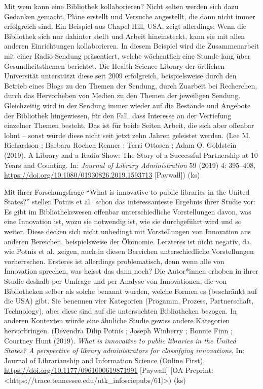 \documentclass[a4paper,
fontsize=11pt,
oneside,
numbers=noperiodatend,
parskip=half-,
bibliography=totoc,
final
]{scrartcl}
\begin{document}
Mit wem kann eine Bibliothek kollaborieren? Nicht selten werden sich
dazu Gedanken gemacht, Pläne erstellt und Versuche angestellt, die dann
nicht immer erfolgreich sind. Ein Beispiel aus Chapel Hill, USA, zeigt
allerdings: Wenn die Bibliothek sich nur dahinter stellt und Arbeit
hineinsteckt, kann sie mit allen anderen Einrichtungen kollaborieren. In
diesem Beispiel wird die Zusammenarbeit mit einer Radio-Sendung
präsentiert, welche wöchentlich eine Stunde lang über Gesundheitsthemen
berichtet. Die Health Science Library der örtlichen Universität
unterstützt diese seit 2009 erfolgreich, beispielsweise durch den
Betrieb eines Blogs zu den Themen der Sendung, durch Zuarbeit bei
Recherchen, durch das Hervorheben von Medien zu den Themen der
jeweiligen Sendung. Gleichzeitig wird in der Sendung immer wieder auf
die Bestände und Angebote der Bibliothek hingewiesen, für den Fall, dass
Interesse an der Vertiefung einzelner Themen besteht. Das ist für beide
Seiten Arbeit, die sich aber offenbar lohnt -- sonst würde diese nicht
seit jetzt zehn Jahren geleistet werden. (Lee M. Richardson ; Barbara
Rochen Renner ; Terri Ottosen ; Adam O. Goldstein (2019). A Library and
a Radio Show: The Story of a Successful Partnership at 10 Years and
Counting. In: \emph{Journal of Library Administration} 59 (2019) 4:
395--408, \url{https://doi.org/10.1080/01930826.2019.1593713}
{[}Paywall{]}) (ks)

Mit ihrer Forschungsfrage \enquote{What is innovative to public
libraries in the United States?} stellen Potnis et al.~schon das
interessanteste Ergebnis ihrer Studie vor: Es gibt im Bibliothekswesen
offenbar unterschiedliche Vorstellungen davon, was eine Innovation ist,
wozu sie notwendig ist, wie sie durchgeführt wird und so weiter. Diese
decken sich nicht unbedingt mit Vorstellungen von Innovation aus anderen
Bereichen, beispielsweise der Ökonomie. Letzteres ist nicht negativ, da,
wie Potnis et al.~zeigen, auch in diesen Bereichen unterschiedliche
Vorstellungen vorherrschen. Ersteres ist allerdings problematisch, denn
wenn alle von Innovation sprechen, was heisst das dann noch? Die
Autor*innen erhoben in ihrer Studie deshalb per Umfrage und per Analyse
von Innovationen, die von Bibliotheken selber als solche benannt wurden,
welche Formen es (beschränkt auf die USA) gibt. Sie benennen vier
Kategorien (Progamm, Prozess, Partnerschaft, Technology), aber diese
sind auf die untersuchten Bibliotheken bezogen. In anderen Kontexten
würde eine ähnliche Studie gewiss andere Kategorien hervorbringen.
(Devendra Dilip Potnis ; Joseph Winberry ; Bonnie Finn ; Courtney Hunt
(2019). \emph{What is innovative to public libraries in the United
States? A perspective of library administrators for classifying
innovations}. In: Journal of Librarianship and Information Science
(Online First), \url{https://doi.org/10.1177/0961000619871991}
{[}Paywall{]} {[}OA-Preprint:
\textless https://trace.tennessee.edu/utk\_infosciepubs/61{]}\textgreater)
(ks)
\end{document}
